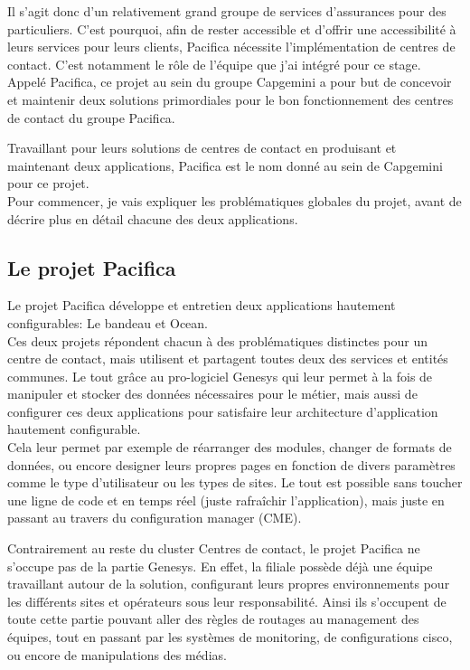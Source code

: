\documentclass{rapport}
\begin{document}
Il s'agit donc d'un relativement grand groupe de services d'assurances pour des particuliers. C'est pourquoi, afin de rester accessible et d'offrir une accessibilité à leurs services pour leurs clients, Pacifica nécessite l'implémentation de centres de contact. C'est notamment le rôle de l'équipe que j'ai intégré pour ce stage. Appelé Pacifica, ce projet au sein du groupe Capgemini a pour but de concevoir et maintenir deux solutions primordiales pour le bon fonctionnement des centres de contact du groupe Pacifica.

Travaillant pour leurs solutions de centres de contact en produisant et maintenant deux applications, Pacifica est le nom donné au sein de Capgemini pour ce projet.\\

Pour commencer, je vais expliquer les problématiques globales du projet, avant de décrire plus en détail chacune des deux applications.


\subsection{Le projet Pacifica}

Le projet Pacifica développe et entretien deux applications hautement configurables: Le bandeau et Ocean.\\
Ces deux projets répondent chacun à des problématiques distinctes pour un centre de contact, mais utilisent et partagent toutes deux des services et entités communes. Le tout grâce au pro-logiciel Genesys qui leur permet à la fois de manipuler et stocker des données nécessaires pour le métier, mais aussi de configurer ces deux applications pour satisfaire leur architecture d'application hautement configurable.\\
Cela leur permet par exemple de réarranger des modules, changer de formats de données, ou encore designer leurs propres pages en fonction de divers paramètres comme le type d'utilisateur ou les types de sites. Le tout est possible sans toucher une ligne de code et en temps réel (juste rafraîchir l'application), mais juste en passant au travers du configuration manager (CME).

Contrairement au reste du cluster Centres de contact, le projet Pacifica ne s'occupe pas de la partie Genesys. En effet, la filiale possède déjà une équipe travaillant autour de la solution, configurant leurs propres environnements pour les différents sites et opérateurs sous leur responsabilité. Ainsi ils s'occupent de toute cette partie pouvant aller des règles de routages au management des équipes, tout en passant par les systèmes de monitoring, de configurations cisco, ou encore de manipulations des médias.\\
\end{document}
